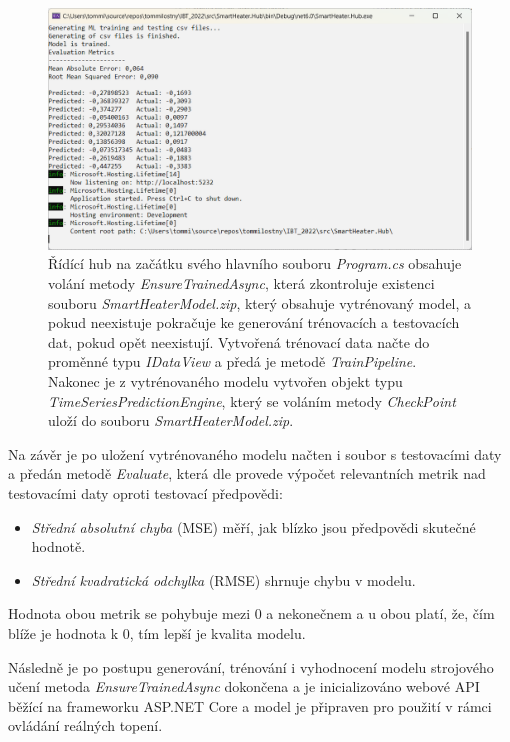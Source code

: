 \begin{figure}[hbt]
\includegraphics[width=\textwidth]{obrazky-figures/ml-training.png}
\caption{Řídící hub na začátku svého hlavního souboru {\it Program.cs} obsahuje volání metody {\it EnsureTrainedAsync}, která zkontroluje existenci souboru {\it SmartHeaterModel.zip}, který obsahuje vytrénovaný model, a pokud neexistuje pokračuje ke generování trénovacích a testovacích dat, pokud opět neexistují. Vytvořená trénovací data načte do proměnné typu {\it IDataView} a předá je metodě {\it TrainPipeline}. Nakonec je z vytrénovaného modelu vytvořen objekt typu {\it TimeSeriesPredictionEngine}, který se voláním metody {\it CheckPoint} uloží do souboru {\it SmartHeaterModel.zip}.}
\end{figure}

\noindent Na závěr je po uložení vytrénovaného modelu načten i soubor s testovacími daty a předán metodě {\it Evaluate}, která dle \cite{mlnet_tutorial} provede výpočet relevantních metrik nad testovacími daty oproti testovací předpovědi:
\begin{itemize}
    \item {\it Střední absolutní chyba} (MSE) měří, jak blízko jsou předpovědi skutečné hodnotě.
    \item {\it Střední kvadratická odchylka} (RMSE) shrnuje chybu v modelu.
\end{itemize}

Hodnota obou metrik se pohybuje mezi 0 a nekonečnem a u obou platí, že, čím blíže je hodnota k 0, tím lepší je kvalita modelu.

Následně je po postupu generování, trénování i vyhodnocení modelu strojového učení metoda {\it EnsureTrainedAsync} dokončena a je inicializováno webové API běžící na frameworku ASP.NET Core a model je připraven pro použití v rámci ovládání reálných topení.

